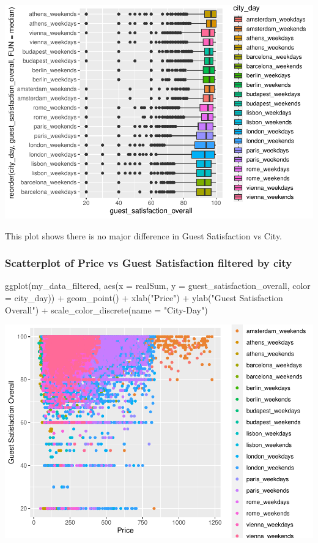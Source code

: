 \documentclass[
]{article}
\newenvironment{Shaded}{\begin{snugshade}}{\end{snugshade}}
\newcommand{\AttributeTok}[1]{\textcolor[rgb]{0.77,0.63,0.00}{#1}}
\newcommand{\FunctionTok}[1]{\textcolor[rgb]{0.00,0.00,0.00}{#1}}
\newcommand{\NormalTok}[1]{#1}
\newcommand{\SpecialCharTok}[1]{\textcolor[rgb]{0.00,0.00,0.00}{#1}}
\newcommand{\StringTok}[1]{\textcolor[rgb]{0.31,0.60,0.02}{#1}}
\begin{document}
\includegraphics{Project_files/figure-latex/unnamed-chunk-7-1.pdf}

This plot shows there is no major difference in Guest Satisfaction vs
City.

\hypertarget{scatterplot-of-price-vs-guest-satisfaction-filtered-by-city}{%
\subsubsection{Scatterplot of Price vs Guest Satisfaction filtered by
city}\label{scatterplot-of-price-vs-guest-satisfaction-filtered-by-city}}

\begin{Shaded}
\begin{Highlighting}[]
\FunctionTok{ggplot}\NormalTok{(my\_data\_filtered, }\FunctionTok{aes}\NormalTok{(}\AttributeTok{x =}\NormalTok{ realSum, }\AttributeTok{y =}\NormalTok{ guest\_satisfaction\_overall,}
    \AttributeTok{color =}\NormalTok{ city\_day)) }\SpecialCharTok{+} \FunctionTok{geom\_point}\NormalTok{() }\SpecialCharTok{+} \FunctionTok{xlab}\NormalTok{(}\StringTok{"Price"}\NormalTok{) }\SpecialCharTok{+} \FunctionTok{ylab}\NormalTok{(}\StringTok{"Guest Satisfaction Overall"}\NormalTok{) }\SpecialCharTok{+}
    \FunctionTok{scale\_color\_discrete}\NormalTok{(}\AttributeTok{name =} \StringTok{"City{-}Day"}\NormalTok{)}
\end{Highlighting}
\end{Shaded}

\includegraphics{Project_files/figure-latex/unnamed-chunk-8-1.pdf}
\end{document}
